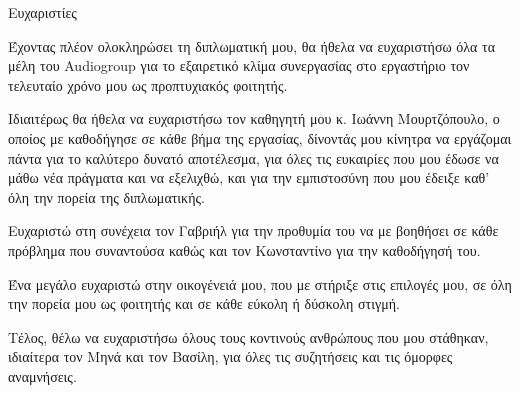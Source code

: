 \begin{center}
{\LARGE Ευχαριστίες}\\[1cm]
\end{center}

Έχοντας πλέον ολοκληρώσει τη διπλωματική μου, θα ήθελα να ευχαριστήσω όλα τα μέλη του Audiogroup για το εξαιρετικό κλίμα συνεργασίας στο εργαστήριο τον τελευταίο χρόνο μου ως προπτυχιακός φοιτητής.

Ιδιαιτέρως θα ήθελα να ευχαριστήσω τον καθηγητή μου κ. Ιωάννη Μουρτζόπουλο, ο οποίος με καθοδήγησε σε κάθε βήμα της εργασίας, δίνοντάς μου κίνητρα να εργάζομαι πάντα για το καλύτερο δυνατό αποτέλεσμα, για όλες τις ευκαιρίες που μου έδωσε να μάθω νέα πράγματα και να εξελιχθώ, και για την εμπιστοσύνη που μου έδειξε καθ' όλη την πορεία της διπλωματικής.

Ευχαριστώ στη συνέχεια τον Γαβριήλ για την προθυμία του να με βοηθήσει σε κάθε πρόβλημα που συναντούσα καθώς και τον Κωνσταντίνο για την καθοδήγησή του.

Ένα μεγάλο ευχαριστώ στην οικογένειά μου, που με στήριξε στις επιλογές μου, σε όλη την πορεία μου ως φοιτητής και σε κάθε εύκολη ή δύσκολη στιγμή.

Τέλος, θέλω να ευχαριστήσω όλους τους κοντινούς ανθρώπους που μου στάθηκαν, ιδιαίτερα τον Μηνά και τον Βασίλη, για όλες τις συζητήσεις και τις όμορφες αναμνήσεις.